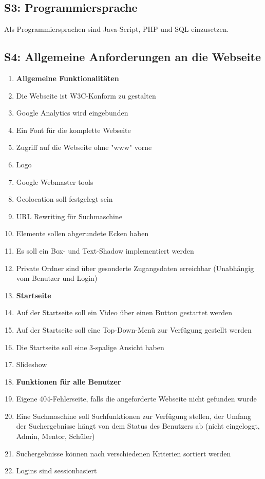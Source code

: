 \documentclass[10pt,a4paper]{scrartcl}
\begin{document}
\subsection{S3: Programmiersprache}
Als Programmiersprachen sind Java-Script, PHP und SQL einzusetzen.


\subsection{S4: Allgemeine Anforderungen an die Webseite}
\begin{enumerate}
\item[] \textbf{Allgemeine Funktionalitäten}
\item Die Webseite ist W3C-Konform zu gestalten
\item Google Analytics wird eingebunden
\item Ein Font für die komplette Webseite
\item Zugriff auf die Webseite ohne "www" vorne
\item Logo
\item Google Webmaster tools
\item Geolocation soll festgelegt sein
\item URL Rewriting für Suchmaschine
\item Elemente sollen abgerundete Ecken haben
\item Es soll ein Box- und Text-Shadow implementiert werden
\item Private Ordner sind über gesonderte Zugangsdaten erreichbar (Unabhängig vom Benutzer und Login)

\item[] \textbf{Startseite}
\item Auf der Startseite soll ein Video über einen Button gestartet werden
\item Auf der Startseite soll eine Top-Down-Menü zur Verfügung gestellt werden
\item Die Startseite soll eine 3-spalige Ansicht haben
\item Slideshow

\item[] \textbf{Funktionen für alle Benutzer}
\item Eigene 404-Fehlerseite, falls die angeforderte Webseite nicht gefunden wurde
\item Eine Suchmaschine soll Suchfunktionen zur Verfügung stellen, der Umfang der Suchergebnisse hängt von dem Status des Benutzers ab (nicht eingeloggt, Admin, Mentor, Schüler)
\item Suchergebnisse können nach verschiedenen Kriterien sortiert werden
\item Logins sind sessionbasiert
\end{enumerate}
\end{document}
